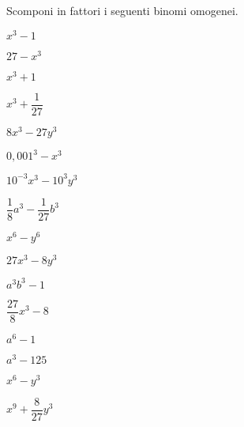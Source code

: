 \begin{esercizio}
\label{ese:17.16}
Scomponi in fattori i seguenti binomi omogenei.
\begin{htmulticols}{4}
\begin{enumeratea}
\item \(x^{3}-1\)
\item \(27-x^{3}\)
\item \(x^{3}+1\)
\item \(x^{3}+\dfrac{1}{27}\)
\item \(8x^{3}-27y^{3}\)
\item \(0,001^{3}-x^{3}\)
\item \(10^{-3}x^{3}-10^{3}y^{3}\)
\item \(\dfrac{1}{8}a^{3}-\dfrac{1}{27}b^{3}\)
\item \(x^{6}-y^{6}\)
\item \(27x^{3}-8y^{3}\)
\item \(a^{3}b^{3}-1\)
\item \(\dfrac{27}{8}x^{3}-8\)
\item \(a^{6}-1\)
\item \(a^{3}-125\)
\item \(x^{6}-y^{3}\)
\item \(x^{9}+\dfrac{8}{27}y^{3}\)
\end{enumeratea}
\end{htmulticols}
\end{esercizio}


